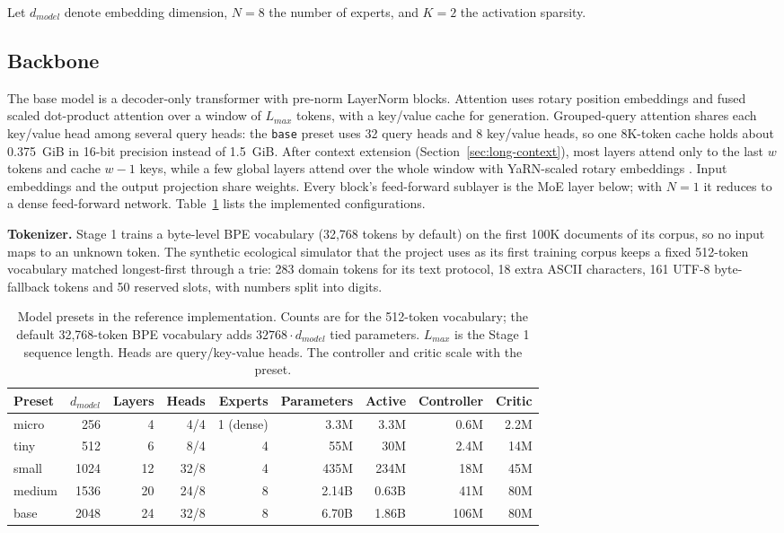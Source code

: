 \documentclass{article}
\begin{document}
Let $d_{model}$ denote embedding dimension, $N=8$ the number of experts, and $K=2$ the activation sparsity.

\subsection{Backbone}

The base model is a decoder-only transformer with pre-norm LayerNorm blocks. Attention uses rotary position embeddings \cite{su2021roformer} and fused scaled dot-product attention over a window of $L_{max}$ tokens, with a key/value cache for generation. Grouped-query attention \cite{ainslie2023gqa} shares each key/value head among several query heads: the \texttt{base} preset uses 32 query heads and 8 key/value heads, so one 8K-token cache holds about 0.375~GiB in 16-bit precision instead of 1.5~GiB. After context extension (Section~\ref{sec:long-context}), most layers attend only to the last $w$ tokens and cache $w-1$ keys, while a few global layers attend over the whole window with YaRN-scaled rotary embeddings \cite{peng2023yarn}. Input embeddings and the output projection share weights. Every block's feed-forward sublayer is the MoE layer below; with $N=1$ it reduces to a dense feed-forward network. Table~\ref{tab:presets} lists the implemented configurations.

\textbf{Tokenizer.} Stage 1 trains a byte-level BPE vocabulary (32,768 tokens by default) on the first 100K documents of its corpus, so no input maps to an unknown token. The synthetic ecological simulator that the project uses as its first training corpus keeps a fixed 512-token vocabulary matched longest-first through a trie: 283 domain tokens for its text protocol, 18 extra ASCII characters, 161 UTF-8 byte-fallback tokens and 50 reserved slots, with numbers split into digits.

\begin{table}[h]
\centering
\caption{Model presets in the reference implementation. Counts are for the 512-token vocabulary; the default 32,768-token BPE vocabulary adds $32768 \cdot d_{model}$ tied parameters. $L_{max}$ is the Stage 1 sequence length. Heads are query/key-value heads. The controller and critic scale with the preset.}
\label{tab:presets}
\begin{tabular}{lrrrrrrrr}
\toprule
Preset & $d_{model}$ & Layers & Heads & Experts & Parameters & Active & Controller & Critic \\
\midrule
micro & 256 & 4 & 4/4 & 1 (dense) & 3.3M & 3.3M & 0.6M & 2.2M \\
tiny & 512 & 6 & 8/4 & 4 & 55M & 30M & 2.4M & 14M \\
small & 1024 & 12 & 32/8 & 4 & 435M & 234M & 18M & 45M \\
medium & 1536 & 20 & 24/8 & 8 & 2.14B & 0.63B & 41M & 80M \\
base & 2048 & 24 & 32/8 & 8 & 6.70B & 1.86B & 106M & 80M \\
\bottomrule
\end{tabular}
\end{table}
\end{document}
